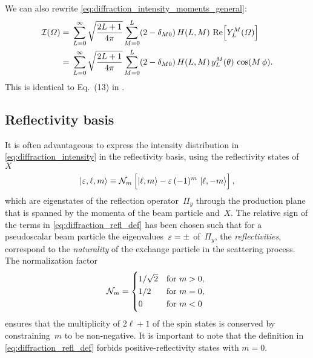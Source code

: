 We can also rewrite \cref{eq:diffraction_intensity_moments_general}:
\begin{align}
  \mathcal{I}(\Omega)
  ={}& \sum_{L = 0}^\infty \sqrt{\frac{2 L + 1}{4 \pi}} \sum_{M = 0}^{L} (2 - \delta_{M 0})\, H(L, M)\, \Re{Y_L^M(\Omega)} \notag
  \\
  \label{eq:diffraction_intensity_moments_real}
  ={}& \sum_{L = 0}^\infty \sqrt{\frac{2 L + 1}{4 \pi}} \sum_{M = 0}^{L} (2 - \delta_{M 0})\, H(L, M)\, y_L^M(\theta)\, \cos(M\, \phi).
\end{align}
This is identical to Eq.~(13) in .


\subsection{Reflectivity basis}%
\label{sec:diffraction:reflectivity}

It is often advantageous to express the intensity distribution in
\cref{eq:diffraction_intensity} in the reflectivity basis, \ie using
the reflectivity states of~$X$
\begin{equation}
  \label{eq:diffraction_refl_def}
  \ket{\refl, \ell, m}
  \equiv \mathcal{N}_m \sBrk[2]{\ket{\ell, m} - \refl\, (-1)^m\, \ket{\ell, {-m}}},
\end{equation}
which are eigenstates of the reflection operator~$\Pi_y$ through the
production plane that is spanned by the momenta of the beam particle
and~$X$.  The relative sign of the terms in
\cref{eq:diffraction_refl_def} has been chosen such that for a
pseudoscalar beam particle the eigenvalues~$\varepsilon = \pm$ of~$\Pi_y$,
\ie the \emph{reflectivities}, correspond to the \emph{naturality} of
the exchange particle in the scattering process.  The normalization
factor
\begin{equation}
  \label{eq:refl_norm}
  \mathcal{N}_m
  = \begin{cases*}
      1 / \sqrt{2} & for $m > 0$, \\
      1 / 2        & for $m = 0$, \\
      0            & for $m < 0$
    \end{cases*}
\end{equation}
ensures that the multiplicity of $2 \ell + 1$ of the spin states is
conserved by constraining~$m$ to be non-negative.  It is important to
note that the definition in \cref{eq:diffraction_refl_def} forbids
positive-reflectivity states with $m = 0$.

